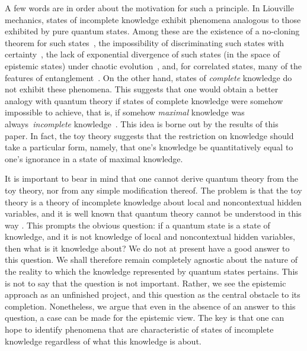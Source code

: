 \documentclass[pra,twocolumn,nofootinbib,showpacs]{revtex4}
\begin{document}
A few words are in order about the motivation for such a principle. In
Liouville mechanics, states of incomplete knowledge exhibit phenomena
analogous to those exhibited by pure quantum states. Among these are the
existence of a no-cloning theorem for such states~\cite%
{Fuchscloning,classicalnocloning}, the impossibility of discriminating such
states with certainty~\cite{Fuchscloning,RudolphSpekkens03}, the lack of
exponential divergence of such states (in the space of epistemic states)
under chaotic evolution~\cite{Ballentinechaos}, and, for correlated states,
many of the features of entanglement~\cite{Col01}. On the other hand, states
of \emph{complete} knowledge do not exhibit these phenomena. This suggests
that one would obtain a better analogy with quantum theory if states of
complete knowledge were somehow impossible to achieve, that is, if somehow
\emph{maximal} knowledge was always\emph{\ incomplete} knowledge~\cite%
{Fuchscloning,FCS,Fuchssamizdat}. This idea is borne out by the results of
this paper. In fact, the toy theory suggests that the restriction on
knowledge should take a particular form, namely, that one's knowledge be
quantitatively equal to one's ignorance in a state of maximal knowledge.

It is important to bear in mind that one cannot derive quantum theory from
the toy theory, nor from any simple modification thereof. The problem is
that the toy theory is a theory of incomplete knowledge about local and
noncontextual hidden variables, and it is well known that quantum theory
cannot be understood in this way \cite{Bell,KochenSpecker,Bell2}. This
prompts the obvious question: if a quantum state is a state of knowledge,
and it is not knowledge of local and noncontextual hidden variables, then
what is it knowledge about? We do not at present have a good answer to this
question. We shall therefore remain completely agnostic about the nature of
the reality to which the knowledge represented by quantum states pertains.
This is not to say that the question is not important. Rather, we see the
epistemic approach as an unfinished project, and this question as the
central obstacle to its completion. Nonetheless, we argue that even in the
absence of an answer to this question, a case can be made for the epistemic
view. The key is that one can hope to identify phenomena that are
characteristic of states of incomplete knowledge regardless of what this
knowledge is about.
\end{document}
